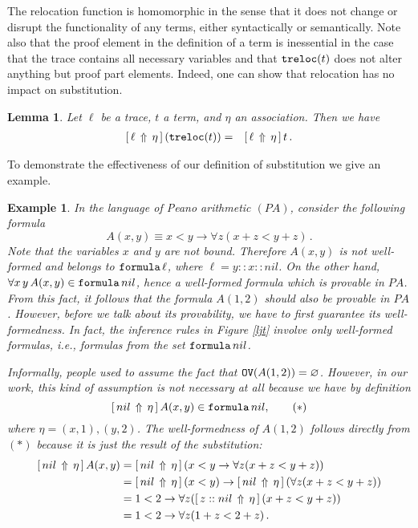 \documentclass{kms-j}
\theoremstyle{plain}
\newtheorem{lem}[thm]{Lemma}
\newtheorem{example}[thm]{Example}
\theoremstyle{remark}
\begin{document}
The relocation function is homomorphic in the sense that it does not
change or disrupt the functionality of any terms,
either syntactically or semantically.
Note also that
the proof element in the definition of a term is inessential
in the case that the trace contains all necessary variables
and that $\ttlift(t)$ does not alter anything but proof part elements.
Indeed, one can show that relocation has no impact on substitution.

\begin{lem}
  Let $\ell$ be a trace, $t$ a term, and $\eta$ an association.
  Then we have
\begin{eqnarray*}
  \substa{(\ttlift (t))}{\eta}{\ell} & = & \substa{t}{\eta}{\ell}\, .
\end{eqnarray*}
\end{lem}

To demonstrate the effectiveness of our definition of substitution we give an example.

\begin{example}\label{exp:pa}
In the language of Peano arithmetic $(PA)$, consider the following formula
\begin{equation*}
A(x, y) \equiv x < y \to \forall z (x + z < y + z)\, .
\end{equation*}
Note that the variables $x$ and $y$ are not bound.
Therefore $A(x, y)$ is not well-formed and belongs to $\tpfml\, \ell$,
where $\ell = y::x::nil$.
On the other hand, $\forall x\, y\, A(x,y) \in \tpfml \, nil$, hence a well-formed formula
which is provable in $PA$.
From this fact, it follows that the formula $A(1, 2)$ should also be provable in $PA$.
However, before we talk about its provability, we have to first guarantee its well-formedness.
In fact, the inference rules in Figure \ref{ljt} involve only well-formed formulas,
i.e., formulas from the set $\tpfml\, nil$.

Informally, people used to assume the fact that $\tPH(A(1,2)) = \varnothing$.
However, in our work, this kind of assumption is not necessary at all
because we have by definition
\begin{equation*}
\substa{A(x,y)}{\eta}{nil} \in \tpfml\, nil,\tag{$\ast$}
\end{equation*}
where $\eta = (x,1), (y,2)$.
The well-formedness of $A(1, 2)$ follows directly from $(\ast)$
because it is just the result of the substitution:
\begin{align*}
\substa{A(x,y)}{\eta}{nil} & = \substa{(x < y \to \forall z (x + z < y + z))}{\eta}{nil}\\
& = \substa{(x < y)}{\eta}{nil} \to \substa{(\forall z (x + z < y + z))}{\eta}{nil}\\
& = 1 < 2 \to \forall z (\substa{ (x + z < y + z))}{\eta}{z::nil}\\
& = 1 < 2 \to \forall z (1 + z < 2 + z)\,.
\end{align*}
\end{example}
\end{document}
